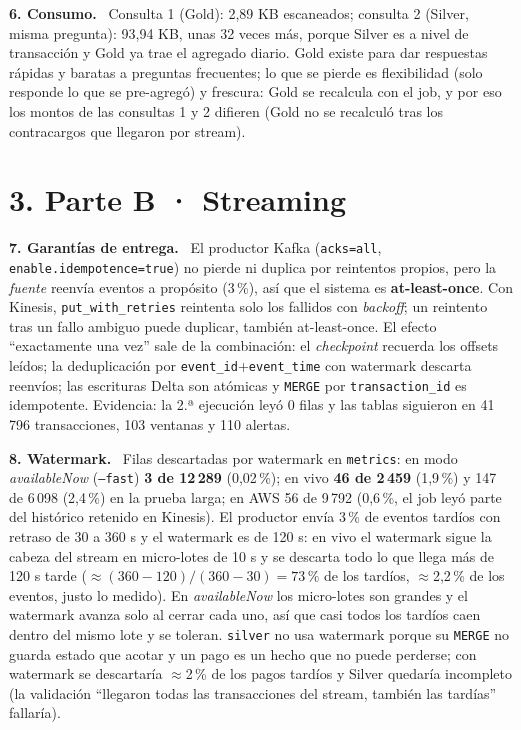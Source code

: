 \documentclass[10pt,a4paper]{article}
\newcommand{\q}[1]{\par\smallskip\textbf{#1}\ }
\newcommand{\code}[1]{\texttt{\small #1}}
\begin{document}
\q{6. Consumo.} Consulta 1 (Gold): 2,89 KB escaneados; consulta 2 (Silver, misma pregunta): 93,94 KB, unas 32 veces más, porque Silver es a nivel de transacción y Gold ya trae el agregado diario. Gold existe para dar respuestas rápidas y baratas a preguntas frecuentes; lo que se pierde es flexibilidad (solo responde lo que se pre-agregó) y frescura: Gold se recalcula con el job, y por eso los montos de las consultas 1 y 2 difieren (Gold no se recalculó tras los contracargos que llegaron por stream).

\section*{3. Parte B · Streaming}
\q{7. Garantías de entrega.} El productor Kafka (\code{acks=all}, \code{enable.idempotence=true}) no pierde ni duplica por reintentos propios, pero la \emph{fuente} reenvía eventos a propósito (3\,\%), así que el sistema es \textbf{at-least-once}. Con Kinesis, \code{put\_with\_retries} reintenta solo los fallidos con \emph{backoff}; un reintento tras un fallo ambiguo puede duplicar, también at-least-once. El efecto ``exactamente una vez'' sale de la combinación: el \emph{checkpoint} recuerda los offsets leídos; la deduplicación por \code{event\_id}+\code{event\_time} con watermark descarta reenvíos; las escrituras Delta son atómicas y \code{MERGE} por \code{transaction\_id} es idempotente. Evidencia: la 2.ª ejecución leyó 0 filas y las tablas siguieron en 41\,796 transacciones, 103 ventanas y 110 alertas.

\q{8. Watermark.} Filas descartadas por watermark en \code{metrics}: en modo \emph{availableNow} (\code{--fast}) \textbf{3 de 12\,289} (0,02\,\%); en vivo \textbf{46 de 2\,459} (1,9\,\%) y 147 de 6\,098 (2,4\,\%) en la prueba larga; en AWS 56 de 9\,792 (0,6\,\%, el job leyó parte del histórico retenido en Kinesis). El productor envía 3\,\% de eventos tardíos con retraso de 30 a 360 s y el watermark es de 120 s: en vivo el watermark sigue la cabeza del stream en micro-lotes de 10 s y se descarta todo lo que llega más de 120 s tarde ($\approx(360-120)/(360-30)=73\,\%$ de los tardíos, $\approx$2,2\,\% de los eventos, justo lo medido). En \emph{availableNow} los micro-lotes son grandes y el watermark avanza solo al cerrar cada uno, así que casi todos los tardíos caen dentro del mismo lote y se toleran. \code{silver} no usa watermark porque su \code{MERGE} no guarda estado que acotar y un pago es un hecho que no puede perderse; con watermark se descartaría $\approx$2\,\% de los pagos tardíos y Silver quedaría incompleto (la validación ``llegaron todas las transacciones del stream, también las tardías'' fallaría).
\end{document}
